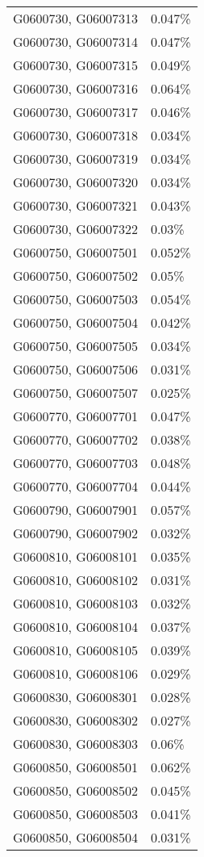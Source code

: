 \begin{longtable}[]{@{}ll@{}}
G0600730, G06007313 & 0.047\% \\
G0600730, G06007314 & 0.047\% \\
G0600730, G06007315 & 0.049\% \\
G0600730, G06007316 & 0.064\% \\
G0600730, G06007317 & 0.046\% \\
G0600730, G06007318 & 0.034\% \\
G0600730, G06007319 & 0.034\% \\
G0600730, G06007320 & 0.034\% \\
G0600730, G06007321 & 0.043\% \\
G0600730, G06007322 & 0.03\% \\
G0600750, G06007501 & 0.052\% \\
G0600750, G06007502 & 0.05\% \\
G0600750, G06007503 & 0.054\% \\
G0600750, G06007504 & 0.042\% \\
G0600750, G06007505 & 0.034\% \\
G0600750, G06007506 & 0.031\% \\
G0600750, G06007507 & 0.025\% \\
G0600770, G06007701 & 0.047\% \\
G0600770, G06007702 & 0.038\% \\
G0600770, G06007703 & 0.048\% \\
G0600770, G06007704 & 0.044\% \\
G0600790, G06007901 & 0.057\% \\
G0600790, G06007902 & 0.032\% \\
G0600810, G06008101 & 0.035\% \\
G0600810, G06008102 & 0.031\% \\
G0600810, G06008103 & 0.032\% \\
G0600810, G06008104 & 0.037\% \\
G0600810, G06008105 & 0.039\% \\
G0600810, G06008106 & 0.029\% \\
G0600830, G06008301 & 0.028\% \\
G0600830, G06008302 & 0.027\% \\
G0600830, G06008303 & 0.06\% \\
G0600850, G06008501 & 0.062\% \\
G0600850, G06008502 & 0.045\% \\
G0600850, G06008503 & 0.041\% \\
G0600850, G06008504 & 0.031\% \\

\end{longtable}
